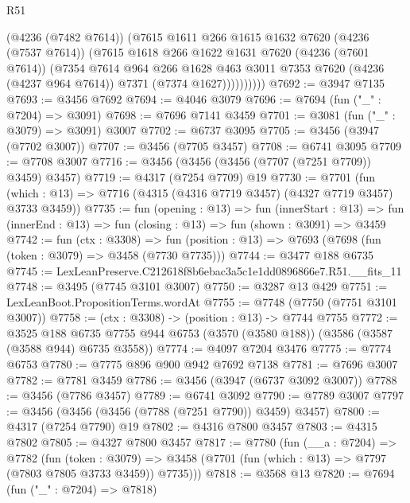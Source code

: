 \begin{lexlean}{R51}
\begin{coremodule}
                (@4236 (@7482 @7614))
                (@7615
                  @1611
                  @266
                  @1615
                  @1632
                  @7620
                  (@4236 (@7537 @7614))
                  (@7615
                    @1618
                    @266
                    @1622
                    @1631
                    @7620
                    (@4236 (@7601 @7614))
                    (@7354
                      @7614
                      @964
                      @266
                      @1628
                      @463
                      @3011
                      @7353
                      @7620
                      (@4236 (@4237 @964 @7614))
                      @7371
                      (@7374 @1627))))))))))
@7692 := @3947 @7135
@7693 := @3456 @7692
@7694 := @4046 @3079
@7696 := @7694 (fun ("_" : @7204) => @3091)
@7698 := @7696 @7141 @3459
@7701 := @3081 (fun ("_" : @3079) => @3091) @3007
@7702 := @6737 @3095
@7705 := @3456 (@3947 (@7702 @3007))
@7707 := @3456 (@7705 @3457)
@7708 := @6741 @3095
@7709 := @7708 @3007
@7716 := @3456 (@3456 (@3456 (@7707 (@7251 @7709)) @3459) @3457)
@7719 := @4317 (@7254 @7709) @19
@7730 := @7701
    (fun (which : @13) => @7716 (@4315 (@4316 @7719 @3457) (@4327 @7719 @3457) @3733 @3459))
@7735 := fun (opening : @13) =>
  fun (innerStart : @13) =>
  fun (innerEnd : @13) => fun (closing : @13) => fun (shown : @3091) => @3459
@7742 := fun (ctx : @3308) =>
  fun (position : @13) => @7693 (@7698 (fun (token : @3079) => @3458 (@7730 @7735)))
@7744 := @3477 @188 @6735
@7745 := LexLeanPreserve.C212618f8b6ebac3a5c1e1dd0896866e7.R51.__fits_11
@7748 := @3495 (@7745 @3101 @3007)
@7750 := @3287 @13 @429
@7751 := LexLeanBoot.PropositionTerms.wordAt
@7755 := @7748 (@7750 (@7751 @3101 @3007))
@7758 := (ctx : @3308) -> (position : @13) -> @7744 @7755
@7772 := @3525
    @188
    @6735
    @7755
    @944
    @6753
    (@3570 (@3580 @188))
    (@3586 (@3587 (@3588 @944) @6735 @3558))
@7774 := @4097 @7204 @3476
@7775 := @7774 @6753
@7780 := @7775 @896 @900 @942 @7692 @7138
@7781 := @7696 @3007
@7782 := @7781 @3459
@7786 := @3456 (@3947 (@6737 @3092 @3007))
@7788 := @3456 (@7786 @3457)
@7789 := @6741 @3092
@7790 := @7789 @3007
@7797 := @3456 (@3456 (@3456 (@7788 (@7251 @7790)) @3459) @3457)
@7800 := @4317 (@7254 @7790) @19
@7802 := @4316 @7800 @3457
@7803 := @4315 @7802
@7805 := @4327 @7800 @3457
@7817 := @7780
    (fun (__a : @7204) =>
    @7782
      (fun (token : @3079) =>
      @3458 (@7701 (fun (which : @13) => @7797 (@7803 @7805 @3733 @3459)) @7735)))
@7818 := @3568 @13
@7820 := @7694 (fun ("_" : @7204) => @7818)

\end{coremodule}
\end{lexlean}
